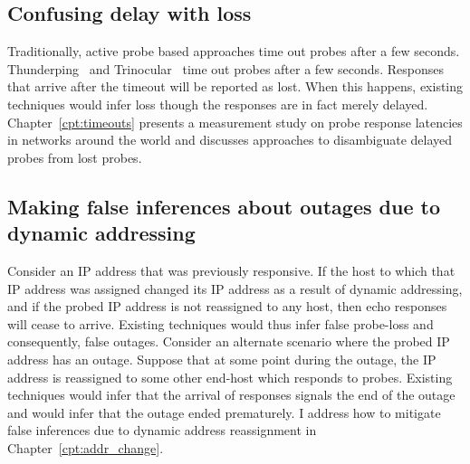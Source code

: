 \subsection{Confusing delay with loss}

Traditionally, active probe based approaches time out probes after a
few seconds. Thunderping~\cite{pingin} and
Trinocular~\cite{trinocular} time out probes after a few
seconds. Responses that arrive after the timeout will be reported as
lost. When this happens, existing techniques would infer loss though
the responses are in fact merely delayed. Chapter~\ref{cpt:timeouts}
presents a measurement study on probe response latencies in networks
around the world and discusses approaches to disambiguate delayed
probes from lost probes.


\subsection{Making false inferences about outages due to dynamic
      addressing}

 Consider an IP address that was previously responsive. If the host
to which that IP address was assigned changed its IP address as a
result of dynamic addressing, and if the probed IP address is not
reassigned to any host, then echo responses will cease to
arrive. Existing techniques would thus infer false probe-loss and
consequently, false outages. Consider an alternate scenario where the
probed IP address has an outage. Suppose that at some point during the
outage, the IP address is reassigned to some other end-host which
responds to probes. Existing techniques would infer that the arrival
of responses signals the end of the outage and would infer that the
outage ended prematurely.  I address how to mitigate false inferences
due to dynamic address reassignment in Chapter~\ref{cpt:addr_change}.


